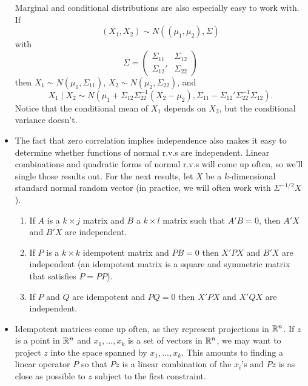 \begin{itemize}[leftmargin=0pt]
  Marginal and conditional distributions are also especially easy to
  work with.  If 
  \begin{equation*}
    (X_1,X_2) \sim N((\mu_1,\mu_2), \Sigma)
  \end{equation*}
  with
  \begin{equation*}
    \Sigma = \begin{pmatrix}
      \Sigma_{11} & \Sigma_{12} \\ \Sigma_{12}' & \Sigma_{22}
    \end{pmatrix}
  \end{equation*}
  then $X_1 \sim N(\mu_1, \Sigma_{11})$, $X_2 \sim N(\mu_2, \Sigma_{22})$, and
  \begin{equation*}    
    X_1 \mid X_2 \sim N(\mu_1 + \Sigma_{12} \Sigma_{22}^{-1} (X_2 - \mu_2),
               \Sigma_{11} - \Sigma_{12}'\Sigma_{22}^{-1} \Sigma_{12}).
  \end{equation*}
  Notice that the conditional mean of $X_1$ depends on $X_2$, but the
  conditional variance doesn't.

\item The fact that zero correlation implies independence also makes
  it easy to determine whether functions of normal r.v.s are
  independent.  Linear combinations and quadratic forms of normal
  r.v.s will come up often, so we'll single those results out.  For
  the next results, let $X$ be a $k$-dimensional standard normal
  random vector (in practice, we will often work with $\Sigma^{-1/2} X$).
  \begin{enumerate}
  \item If $A$ is a $k \times j$ matrix and $B$ a $k \times l$ matrix such that
    $A'B = 0$, then $A'X$ and $B'X$ are independent.
  \item If $P$ is a $k \times k$ idempotent matrix and $PB = 0$ then $X'PX$
    and $B'X$ are independent (an idempotent matrix is a square and
    symmetric matrix that satisfies $P = PP$).
  \item If $P$ and $Q$ are idempotent and $PQ = 0$ then $X'PX$ and
    $X'QX$ are independent.
  \end{enumerate}
  
\item Idempotent matrices come up often, as they represent projections
  in $\mathbb{R}^n$.  If $z$ is a point in $\mathbb{R}^n$ and $x_1,...,x_k$ is a set of
  vectors in $\mathbb{R}^n$, we may want to project $z$ into the space spanned
  by $x_1,...,x_k$.  This amounts to finding a linear operator $P$ so
  that $P z$ is a linear combination of the $x_i$'s and $P z$ is as
  close as possible to $z$ subject to the first constraint.


\end{itemize}
